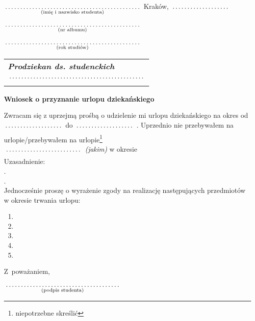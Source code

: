 \documentclass[a4paper,11pt]{article}
\newcommand{\fillField}[2]{
    $\underset{\text{#1}}{\parbox[t]{#2}{\dotfill}}$
}
\begin{document}
\noindent
\fillField{(imię i nazwisko studenta)}{7cm} \hfill Kraków, \fillField{}{3cm}\\\\
\fillField{(nr albumu)}{7cm} \\\\
\fillField{(rok studiów)}{7cm} \\


\phantom{a}\hfill
\begin{tabular}[c]{@{}l@{}}
\textit{\textbf{Prodziekan ds. studenckich}} \\\\
\fillField{}{7cm}
\end{tabular}

\vskip 1.5cm

\begin{center}
{\Large \textbf{Wniosek o przyznanie urlopu dziekańskiego}}
\end{center}

\vskip 0.5cm

\noindent
Zwracam się z uprzejmą prośbą o udzielenie mi urlopu dziekańskiego na okres
od \fillField{}{3cm} do \fillField{}{3cm}. Uprzednio nie przebywałem na
urlopie/przebywałem na urlopie\footnote[1]{niepotrzebne skreślić} \\
\fillField{}{4cm} \textit{(jakim)} w okresie
\dotfill\\
Uzasadnienie: \dotfill\\
.\dotfill\\
.\dotfill\\

\noindent
Jednocześnie proszę o wyrażenie zgody na realizację następujących przedmiotów
w okresie trwania urlopu:
    \begin{enumerate}
        \item \dotfill
        \item \dotfill
        \item \dotfill
        \item \dotfill
        \item \dotfill
    \end{enumerate}

\vskip 1.3cm

\hspace{\fill} Z~poważaniem, \hspace{3cm} \\\\
\null\hfill \fillField{(podpis studenta)}{6cm} %
\vskip 1.0cm
\end{document}
